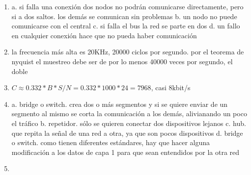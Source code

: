 \documentclass[11pt]{article}
\begin{document}
\begin{enumerate}
\begin{itemize}
\begin{itemize}
\item si un nodo no puede retransmitir la red falla
\end{itemize}
\item malla
\begin{itemize}
\item \textbf{totalmente conectada}
\item \textbf{parcialmente conectada}
\end{itemize}
\end{itemize}
b.
\begin{itemize}
\item bus: n, cada nodo con el cable central
\item estrella: n-1, cada nodo con el nodo central
\item anillo: n, cada uno con el siguiente y el último con el primero
\item malla: hasta \(\frac{n(n-1)}{2}}\), según sea totalmente o parcialmente conectada
\end{itemize}
\item a. si falla una conexión dos nodos no podrán comunicarse directamente, pero si a dos saltos. los demás se comunican sin problemas
b. un nodo no puede comunicarse con el central
c. si falla el bus la red se parte en dos
d. un fallo en cualquier conexión hace que no pueda haber comunicación
\item la frecuencia más alta es 20KHz, 20000 ciclos por segundo. por el teorema de nyquist el muestreo debe ser de por lo menos 40000 veces por segundo, el doble
\item \(C\approx 0.332*B*S/N=0.332*1000*24=7968\), casi 8kbit/s
\item a. bridge o switch. crea dos o más segmentos y si se quiere enviar de un segmento al mismo se corta la comunicación a los demás, alivianando un poco el tráfico
b. repetidor. sólo se quieren conectar dos dispositivos lejanos
c. hub. que repita la señal de una red a otra, ya que son pocos dispositivos
d. bridge o switch. como tienen diferentes estándares, hay que hacer alguna modificación a los datos de capa 1 para que sean entendidos por la otra red
\item 


\end{enumerate}
\end{document}
